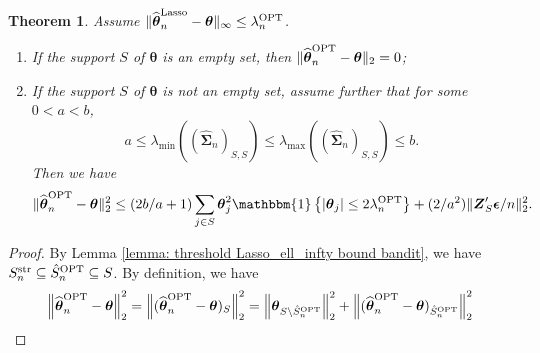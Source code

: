 \documentclass[aos,preprint]{imsart}
\theoremstyle{plain}
\newtheorem{theorem}{Theorem}
\theoremstyle{definition}
\newtheorem{remark}{Remark}
\newcommand{\btheta}{\boldsymbol{\theta}}
\newcommand{\bd}[1]{\boldsymbol{#1}}
\newcommand{\hbtheta}{\widehat{\boldsymbol{\theta}}}
\newcommand{\idf}{\mathbbm{1}}
\newcommand{\lmin}[1]{\lambda_{\min}\left(#1\right)}
\newcommand{\lmax}[1]{\lambda_{\max}\left(#1\right)}
\newcommand{\ltheta}{\hbtheta^{\textup{Lasso}}}
\newcommand{\ptheta}{\widehat{\boldsymbol{\theta}}^{\textup{OPT}}}
\newcommand{\hdlambda}{\lambda^{\textup{OPT}}}
\newcommand{\bZ}{\boldsymbol{Z}}
\newcommand{\pS}{\hat{S}^{\textup{OPT}}}
\newcommand{\hdS}{\hat{S}^{\textup{OPT}}}
\newcommand{\hbSigma}{\hat{\boldsymbol{\Sigma}}}
\newcommand{\bepsilon}{\bd{\epsilon}}
\begin{document}
\begin{appendix}
\begin{theorem} \label{thm: ols post l2 estimation error}
Assume $\|\ltheta_n-\btheta\|_{\infty}\le \hdlambda_n$.
\begin{enumerate}[label=\roman*)]
    \item If the support $S$ of $\btheta$ is an empty set, then
$\|\ptheta_n-\btheta \|_2 = 0$;
\item If the support $S$ of $\btheta$ is not an empty set, assume further that for some $0< a<b$,
$$a\le \lmin{(\hbSigma_n)_{S,S}} \le \lmax{(\hbSigma_n)_{S,S}} \le b.
$$
Then we have 
$$\|\ptheta_n-\btheta \|_2^2 \le (2b/a+1)\sum_{j\in S} \btheta_j^2 \idf\left\{|\btheta_j| \le 2\hdlambda_n \right\} + (2/a^2)\|\bZ_S'\bepsilon/n\|_2^2.$$
\end{enumerate}
\end{theorem}


\begin{proof}
By Lemma \ref{lemma: threshold Lasso_ell_infty bound bandit}, we have $    S_n^{\textup{str}}\subseteq \hdS_n\subseteq S$. By definition, we have
\begin{equation}\label{eq: proof of estimation error in stage 3 3}
    \left\|\ptheta_n-\btheta \right\|_2^2  = \left\|(\ptheta_n-\btheta)_S \right\|_2^2 = \left\|\btheta_{S\backslash\hdS_n} \right\|_2^2+ \left\|(\ptheta_n-\btheta)_{\hdS_n} \right\|_2^2
\end{equation}


\end{proof}
\end{appendix}
\end{document}
